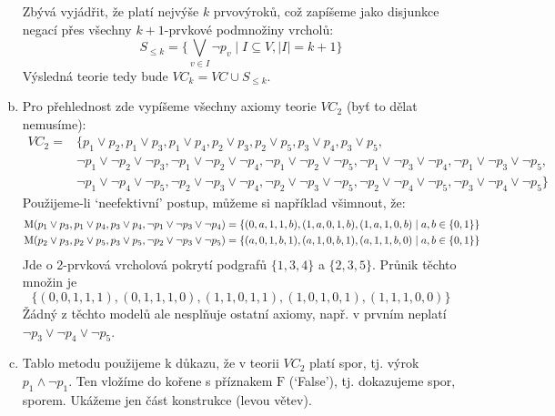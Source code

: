 \begin{problem}
\begin{solution}
\begin{enumerate}[(a)]
            Zbývá vyjádřit, že platí nejvýše $k$ prvovýroků, což zapíšeme jako disjunkce negací přes všechny $k+1$-prvkové podmnožiny vrcholů:
            $$
            S_{\leq k}=\{\bigvee_{v\in I} \neg p_v\mid I\subseteq V,|I|=k+1\}
            $$
            Výsledná teorie tedy bude $VC_k=VC\cup S_{\leq k}$.
            \item Pro přehlednost zde vypíšeme všechny axiomy teorie $VC_2$ (byť to dělat nemusíme):
            \begin{align*}
                VC_2=&\{p_1\lor p_2,p_1\lor p_3,p_1\lor p_4,p_2\lor p_3,p_2\lor p_5,p_3\lor p_4,p_3\lor p_5,\\
                &\neg p_1\lor\neg p_2\lor\neg p_3,\neg p_1\lor\neg p_2\lor\neg p_4,
                \neg p_1\lor\neg p_2\lor\neg p_5,\neg p_1\lor\neg p_3\lor\neg p_4,
                \neg p_1\lor\neg p_3\lor\neg p_5,\\ &\neg p_1\lor\neg p_4\lor\neg p_5,
                \neg p_2\lor\neg p_3\lor\neg p_4,\neg p_2\lor\neg p_3\lor\neg p_5,
                \neg p_2\lor\neg p_4\lor\neg p_5,\neg p_3\lor\neg p_4\lor\neg p_5\}
            \end{align*}
            Použijeme-li `neefektivní' postup, můžeme si například všimnout, že:
            \begin{align*}
                \operatorname{M}(p_1\lor p_3,p_1\lor p_4,p_3\lor p_4,\neg p_1\lor\neg p_3\lor\neg p_4)&=\{(0,a,1,1,b),(1,a,0,1,b),(1,a,1,0,b)\mid a,b\in\{0,1\}\}\\
                \operatorname{M}(p_2\lor p_3,p_2\lor p_5,p_3\lor p_5,\neg p_2\lor\neg p_3\lor\neg p_5)&=\{(a,0,1,b,1),(a,1,0,b,1),(a,1,1,b,0)\mid a,b\in\{0,1\}\}\\
            \end{align*}
            Jde o 2-prvková vrcholová pokrytí podgrafů $\{1,3,4\}$ a $\{2,3,5\}$. Průnik těchto množin je
            $$
                \{(0,0,1,1,1),(0,1,1,1,0),(1,1,0,1,1),(1,0,1,0,1),(1,1,1,0,0)\}
            $$
            Žádný z těchto modelů ale nesplňuje ostatní axiomy, např. v prvním neplatí $\neg p_3\lor\neg p_4\lor\neg p_5$.
            \item Tablo metodu použijeme k důkazu, že v teorii $VC_2$ platí spor, tj. výrok $p_1\land \neg p_1$. Ten vložíme do kořene s příznakem $\mathrm{F}$ (`False'), tj. dokazujeme spor, sporem. Ukážeme jen část konstrukce (levou větev).
           

\end{enumerate}
\end{solution}
\end{problem}
